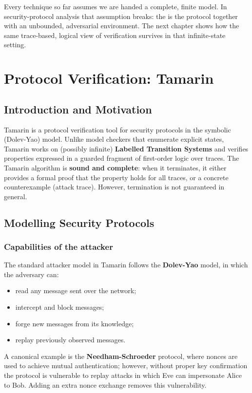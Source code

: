 \documentclass[oneside]{academica}
\begin{document}
\bigskip
Every technique so far assumes we are handed a complete, finite model.
In security-protocol analysis that assumption breaks: the  is the protocol together with an unbounded, adversarial environment.
The next chapter shows how the same trace-based, logical view of verification survives in that infinite-state setting.

\chapter{Protocol Verification: Tamarin}

\section{Introduction and Motivation}

Tamarin is a protocol verification tool for security protocols in the symbolic (Dolev-Yao) model.
Unlike model checkers that enumerate explicit states, Tamarin works on (possibly infinite) \textbf{Labelled Transition Systems} and verifies properties expressed in a guarded fragment of first-order logic over traces.
The Tamarin algorithm is \textbf{sound and complete}: when it terminates, it either provides a formal proof that the property holds for all traces, or a concrete counterexample (attack trace). However, termination is not guaranteed in general.

\section{Modelling Security Protocols}

\subsection{Capabilities of the attacker}

The standard attacker model in Tamarin follows the \textbf{Dolev-Yao} model, in which the adversary can:
\begin{itemize}
  \item read any message sent over the network;
  \item intercept and block messages;
  \item forge new messages from its knowledge;
  \item replay previously observed messages.
\end{itemize}
A canonical example is the \textbf{Needham-Schroeder} protocol, where nonces are used to achieve mutual authentication; however, without proper key confirmation the protocol is vulnerable to replay attacks in which Eve can impersonate Alice to Bob. Adding an extra nonce exchange removes this vulnerability.
\end{document}
